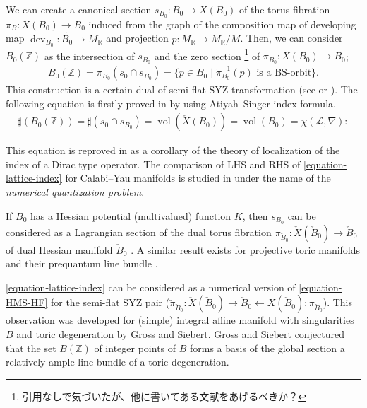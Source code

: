 \documentclass[a4paper,dvipdfmx,reqno,12pt]{amsart}
\theoremstyle{definition}
\newcommand{\Z}{\mathbb{Z}}%
\newcommand{\mcal}[1]{\mathcal{#1}}%
\newcommand{\opn}[1]{\operatorname{#1}}
\numberwithin{equation}{section}
\begin{document}
We can create a canonical section 
$s_{B_0}\colon B_0 \to X(B_0)$ of the torus fibration
 $\pi_B:X(B_0)\to B_0$
induced from the graph of the composition map of developing map
$\opn{dev}_{B_0}\colon \widetilde{B_0}\to M_{{\mathbb{R}}}$ 
\cite[p.641]{goldmanRadianceObstructionParallel1984a} and projection
$p:M_{{\mathbb{R}}}\to M_{{\mathbb{R}}}/M$. 
Then, we can consider $B_0(\Z)$ as the intersection of 
$s_{B_0}$ and the zero section
\footnote{引用なしで気づいたが、他に書いてある文献をあげるべきか？}
of 
$\pi_{B_0}:X(B_0)\to B_0$;
\begin{align}
B_0(\mathbb{Z})=\pi_{B_0}(s_0\cap s_{B_0})
=\{p\in B_0 \mid  \check{\pi}_{B_0}^{-1}(p) 
\text{ is a BS-orbit}\}.
\end{align}
This construction is a certain dual of semi-flat SYZ 
transformation 
(see \cite[Theorem 1.1]{MR1876073} or \cite[]{MR1882331}). 
The following equation is firstly proved in 
\cite[Corollary 4.1]{MR1461965} by using Atiyah--Singer index formula.
\begin{align} \label{equation-lattice-index}
\sharp (B_0(\Z))=\sharp (s_0\cap s_{B_0})
=\opn{vol}(\check{X}(B_0))=\opn{vol}(B_0)
=\chi(\mcal{L},\nabla):
\end{align}

This equation is reproved in \cite{MR2676658} as a 
corollary of the theory of localization of the 
index of a Dirac type operator.
The comparison of LHS and RHS of 
\cref{equation-lattice-index} for
Calabi--Yau manifolds is studied in 
\cite{1999math......2027T} under 
the name of the \emph{numerical quantization problem}.

If $B_0$ has a Hessian potential (multivalued) function $K$, then $s_{B_0}$ can be 
considered as a Lagrangian section of the dual torus 
fibration $\pi_{\check{B}_0}\colon 
\check{X}(\check{B}_0)\to \check{B}_0$ of dual Hessian
manifold $\check{B}_0$ \cite[Proposition 6.9]{MR2567952}.
A similar result exists for projective toric manifolds 
and their prequantum line bundle 
\cite[Theorem 3.20]{yamaguchimaster}. 

\cref{equation-lattice-index} can be considered
as a numerical version of \cref{equation-HMS-HF}
for the semi-flat SYZ pair 
($\check{\pi}_{\check{B}_0}\colon \check{X}(\check{B}_0)
\to \check{B}_0 \leftarrow X(\check{B}_0)\colon \pi_{\check{B}_0}$). 
This observation was developed for 
(simple) integral affine manifold with singularities
$B$
and toric degeneration by Gross and Siebert. 
Gross and Siebert conjectured 
that the set $B(\mathbb{Z})$ of integer points of 
$B$ forms a basis of the global section a 
relatively ample line bundle of a toric degeneration.
\end{document}
